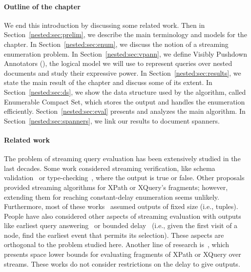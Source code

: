 
\paragraph{Outline of the chapter} We end this introduction by discussing some related work. 
Then in Section~\ref{nested:sec:prelim}, we describe the main terminology and models for the chapter. 
In Section~\ref{nested:sec:enum}, we discuss the notion of a streaming enumeration problem. 
In Section~\ref{nested:sec:vpann}, we define Visibly Pushdown Annotators (\vpann), the logical model we will use to represent queries over nested documents and study their expressive power. In Section~\ref{nested:sec:results}, we state the main result of the chapter and discuss some of its extent. In Section~\ref{nested:sec:ds}, we show the data structure used by the algorithm, called Enumerable Compact Set, which stores the output and handles the enumeration efficiently. Section~\ref{nested:sec:eval} presents and analyzes the main algorithm. In Section~\ref{nested:sec:spanners}, we link our results to document spanners. 

\paragraph{Related work} The problem of streaming query evaluation has been extensively studied in the last decades. Some work considered streaming verification, like schema validation~\cite{SegoufinV02} or type-checking~\cite{KumarMV07}, where the output is true or false. Other proposals~\cite{ChenDZ06,OlteanuFB04,JosifovskiFB05,GreenGMOS04,Olteanu07} provided streaming algorithms for XPath or XQuery's fragments; however, extending them for reaching constant-delay enumeration seems unlikely. Furthermore, most of these works~\cite{KumarMV07,GouC07,GauwinNT09} assumed outputs of fixed size (i.e., tuples). People have also considered other aspects of streaming evaluation with outputs like earliest query answering~\cite{GauwinNT09} or bounded delay~\cite{DBLP:conf/lata/GauwinNT09} (i.e., given the first visit of a node, find the earliest event that permits its selection). These aspects are orthogonal to the problem studied here.
Another line of research is~\cite{BarYossefFJ05,BarYossefFJ07}, which presents space lower bounds for evaluating fragments of XPath or XQuery over streams. These works do not consider restrictions on the delay to give outputs.  

